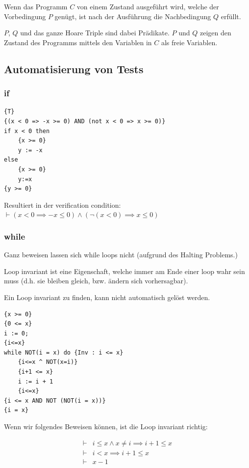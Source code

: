Wenn das Programm $C$ von einem Zustand ausgeführt wird, welche der Vorbedingung $P$ genügt, ist nach der Ausführung die Nachbedingung $Q$ erfüllt.

$P$, $Q$ und das ganze Hoare Triple sind dabei Prädikate. $P$ und $Q$ zeigen den Zustand des Programms mittels den Variablen in $C$ als freie Variablen.



\subsection{Automatisierung von Tests}

\subsubsection{if}

\begin{lstlisting}
{T}
{(x < 0 => -x >= 0) AND (not x < 0 => x >= 0)}
if x < 0 then
	{x >= 0}
	y := -x
else
	{x >= 0}
	y:=x
{y >= 0}
\end{lstlisting}

Resultiert in der verification condition: $\vdash (x<0 \implies -x \leq 0) \land (\lnot (x < 0) \implies x \leq 0)$

\subsubsection{while}

Ganz beweisen lassen sich while loops nicht (aufgrund des Halting Problems.)

Loop invariant ist eine Eigenschaft, welche immer am Ende einer loop wahr sein muss (d.h. sie bleiben gleich, bzw. ändern sich vorhersagbar).

Ein Loop invariant zu finden, kann nicht automatisch gelöst werden.


\begin{lstlisting}
{x >= 0}
{0 <= x}
i := 0;
{i<=x}
while NOT(i = x) do {Inv : i <= x}
	{i<=x ^ NOT(x=i)}
	{i+1 <= x}
	i := i + 1
	{i<=x}
{i <= x AND NOT (NOT(i = x))}
{i = x}
\end{lstlisting}

Wenn wir folgendes Beweisen können, ist die Loop invariant richtig:

\begin{align*}
\vdash & i \leq x \land x \neq i \implies i + 1 \leq x \\
\vdash & i < x \implies i+1 \leq x \\
\vdash & x -1
\end{align*}

